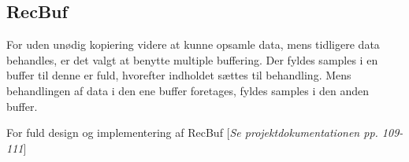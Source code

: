 \subsection{RecBuf}
For uden unødig kopiering videre at kunne opsamle data, mens tidligere data behandles, er det valgt at benytte multiple buffering. Der fyldes samples i en buffer til denne er fuld, hvorefter indholdet sættes til behandling. Mens behandlingen af data i den ene buffer foretages, fyldes samples i den anden buffer.

For fuld design og implementering af RecBuf [\textit{Se projektdokumentationen pp. 109-111}]